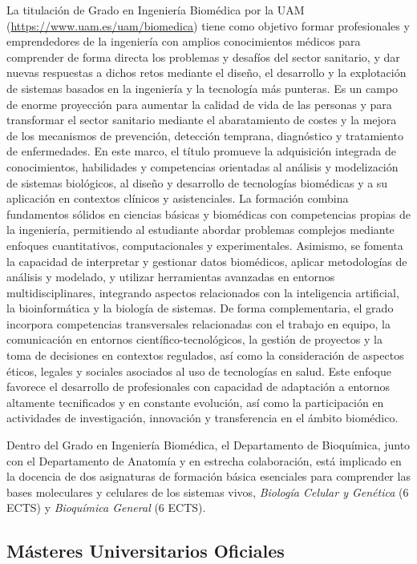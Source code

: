 \documentclass[
  11pt,
  a4paper,
  twoside]{scrreprt}
\begin{document}
La titulación de Grado en Ingeniería Biomédica por la UAM
(\url{https://www.uam.es/uam/biomedica}) tiene como objetivo formar
profesionales y emprendedores de la ingeniería con amplios conocimientos
médicos para comprender de forma directa los problemas y desafíos del
sector sanitario, y dar nuevas respuestas a dichos retos mediante el
diseño, el desarrollo y la explotación de sistemas basados en la
ingeniería y la tecnología más punteras. Es un campo de enorme
proyección para aumentar la calidad de vida de las personas y para
transformar el sector sanitario mediante el abaratamiento de costes y la
mejora de los mecanismos de prevención, detección temprana, diagnóstico
y tratamiento de enfermedades. En este marco, el título promueve la
adquisición integrada de conocimientos, habilidades y competencias
orientadas al análisis y modelización de sistemas biológicos, al diseño
y desarrollo de tecnologías biomédicas y a su aplicación en contextos
clínicos y asistenciales. La formación combina fundamentos sólidos en
ciencias básicas y biomédicas con competencias propias de la ingeniería,
permitiendo al estudiante abordar problemas complejos mediante enfoques
cuantitativos, computacionales y experimentales. Asimismo, se fomenta la
capacidad de interpretar y gestionar datos biomédicos, aplicar
metodologías de análisis y modelado, y utilizar herramientas avanzadas
en entornos multidisciplinares, integrando aspectos relacionados con la
inteligencia artificial, la bioinformática y la biología de sistemas. De
forma complementaria, el grado incorpora competencias transversales
relacionadas con el trabajo en equipo, la comunicación en entornos
científico-tecnológicos, la gestión de proyectos y la toma de decisiones
en contextos regulados, así como la consideración de aspectos éticos,
legales y sociales asociados al uso de tecnologías en salud. Este
enfoque favorece el desarrollo de profesionales con capacidad de
adaptación a entornos altamente tecnificados y en constante evolución,
así como la participación en actividades de investigación, innovación y
transferencia en el ámbito biomédico.

Dentro del Grado en Ingeniería Biomédica, el Departamento de Bioquímica,
junto con el Departamento de Anatomía y en estrecha colaboración, está
implicado en la docencia de dos asignaturas de formación básica
esenciales para comprender las bases moleculares y celulares de los
sistemas vivos, \emph{Biología Celular y Genética} (6 ECTS) y
\emph{Bioquímica General} (6 ECTS).

\subsection{Másteres Universitarios
Oficiales}\label{muxe1steres-universitarios-oficiales}
\end{document}
